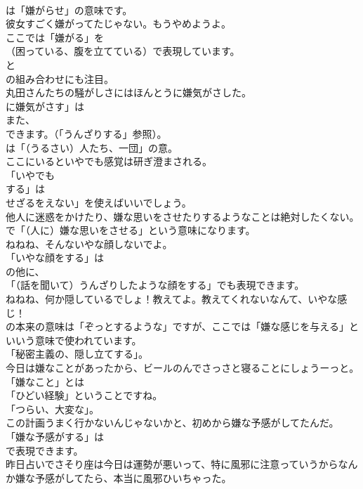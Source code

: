 \documentclass[8pt]{extreport}
\begin{document}
\begin{CJK}{UTF8}{min}
\\	は「嫌がらせ」の意味です。	
\\	彼女すごく嫌がってたじゃない。もうやめようよ。 
\\	ここでは「嫌がる」を 
\\	（困っている、腹を立てている）で表現しています。
\\	と 
\\	の組み合わせにも注目。	
\\	丸田さんたちの騒がしさにはほんとうに嫌気がさした。 
\\	に嫌気がさす」は
\\	また、
\\	できます。（「うんざりする」参照）。
\\	は「（うるさい）人たち、一団」の意。	
\\	ここにいるといやでも感覚は研ぎ澄まされる。 
\\	「いやでも 
\\	する」は
\\	せざるをえない」を使えばいいでしょう。	
\\	他人に迷惑をかけたり、嫌な思いをさせたりするようなことは絶対したくない。 
\\	で「（人に）嫌な思いをさせる」という意味になります。	
\\	ねねね、そんないやな顔しないでよ。 
\\	「いやな顔をする」は
\\	の他に、
\\	「（話を聞いて）うんざりしたような顔をする」でも表現できます。	
\\	ねねね、何か隠しているでしょ！教えてよ。教えてくれないなんて、いやな感じ！ 
\\	の本来の意味は「ぞっとするような」ですが、ここでは「嫌な感じを与える」といいう意味で使われています。
\\	「秘密主義の、隠し立てする」。	
\\	今日は嫌なことがあったから、ビールのんでさっさと寝ることにしょうーっと。 
\\	「嫌なこと」とは
\\	「ひどい経験」ということですね。
\\	「つらい、大変な」。	
\\	この計画うまく行かないんじゃないかと、初めから嫌な予感がしてたんだ。 
\\	「嫌な予感がする」は
\\	で表現できます。	
\\	昨日占いでさそり座は今日は運勢が悪いって、特に風邪に注意っていうからなんか嫌な予感がしてたら、本当に風邪ひいちゃった。 

\end{CJK}
\end{document}
